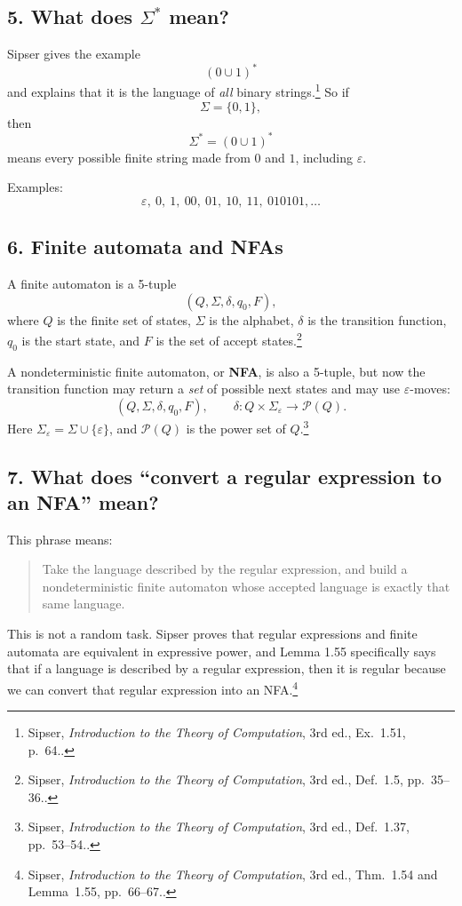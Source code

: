 \documentclass[12pt]{article}
\newcommand{\sipser}[1]{\footnote{Sipser, \emph{Introduction to the Theory of Computation}, 3rd ed., #1.}}
\begin{document}
\subsection*{5. What does \(\Sigma^*\) mean?}

Sipser gives the example
\[
(0\cup 1)^*
\]
and explains that it is the language of \emph{all} binary strings.\sipser{Ex.~1.51, p.~64.} So if
\[
\Sigma=\{0,1\},
\]
then
\[
\Sigma^*=(0\cup 1)^*
\]
means every possible finite string made from \(0\) and \(1\), including \(\varepsilon\).

Examples:
\[
\varepsilon,\ 0,\ 1,\ 00,\ 01,\ 10,\ 11,\ 010101,\ldots
\]

\subsection*{6. Finite automata and NFAs}

A finite automaton is a 5-tuple
\[
(Q,\Sigma,\delta,q_0,F),
\]
where \(Q\) is the finite set of states, \(\Sigma\) is the alphabet, \(\delta\) is the transition function, \(q_0\) is the start state, and \(F\) is the set of accept states.\sipser{Def.~1.5, pp.~35--36.}

A nondeterministic finite automaton, or \textbf{NFA}, is also a 5-tuple, but now the transition function may return a \emph{set} of possible next states and may use \(\varepsilon\)-moves:
\[
(Q,\Sigma,\delta,q_0,F),\qquad \delta:Q\times \Sigma_\varepsilon \to \mathcal{P}(Q).
\]
Here \(\Sigma_\varepsilon=\Sigma\cup\{\varepsilon\}\), and \(\mathcal{P}(Q)\) is the power set of \(Q\).\sipser{Def.~1.37, pp.~53--54.}

\subsection*{7. What does ``convert a regular expression to an NFA'' mean?}

This phrase means:

\begin{quote}
Take the language described by the regular expression, and build a nondeterministic finite automaton whose accepted language is exactly that same language.
\end{quote}

This is not a random task. Sipser proves that regular expressions and finite automata are equivalent in expressive power, and Lemma 1.55 specifically says that if a language is described by a regular expression, then it is regular because we can convert that regular expression into an NFA.\sipser{Thm.~1.54 and Lemma~1.55, pp.~66--67.}
\end{document}
